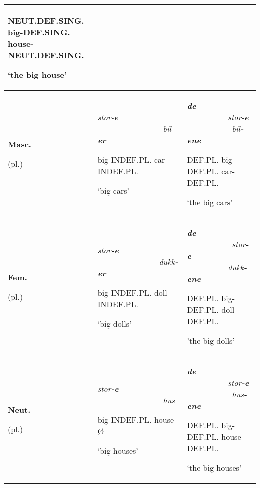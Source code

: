 \documentclass[12pt]{article}
\begin{document}
\begin{flushleft}
\begin{supertabular}{m{0.34905985in}m{2.7663598in}m{3.38376in}}
NEUT.DEF.SING. big-DEF.SING. house-NEUT.DEF.SING.

‘the big house’\\\hline
\textbf{Masc.}

(pl.) &
\textit{stor-}\textbf{\textit{e}}\textit{ \ \ \ \ \ \ \ \ \ \ \ \ \ \ \ \ bil-}\textbf{\textit{er}}

big-INDEF.PL. car-INDEF.PL.

‘big cars’ &
\textbf{\textit{de}}\textit{ \ \ \ \ \ \ \ \ \ \ stor-}\textbf{\textit{e}}\textit{ \ \ \ \ \ \ \ \ \ \ \ bil}\textbf{\textit{{}-ene}}

DEF.PL. big-DEF.PL. car-DEF.PL.

‘the big cars’\\\hline
\textbf{Fem.}

(pl.) &
\textit{stor}\textbf{\textit{{}-e}}\textit{ \ \ \ \ \ \ \ \ \ \ \ \ \ \ \ dukk}\textbf{\textit{{}-er}}

big-INDEF.PL. doll-INDEF.PL.

‘big dolls’ &
\textbf{\textit{de}}\textit{ \ \ \ \ \ \ \ \ \ \ \ stor}\textbf{\textit{{}-e}}\textit{ \ \ \ \ \ \ \ \ \ \ dukk}\textbf{\textit{{}-ene}}

DEF.PL. big-DEF.PL. doll-DEF.PL.

’the big dolls’\\\hline
\textbf{Neut.}

(pl.) &
\textit{stor}\textbf{\textit{{}-e}}\textit{ \ \ \ \ \ \ \ \ \ \ \ \ \ \ \ \ hus}

big-INDEF.PL. house-Ø

‘big houses’ &
\textbf{\textit{de}}\textit{ \ \ \ \ \ \ \ \ \ \ stor}\textbf{\textit{{}-e}}\textit{ \ \ \ \ \ \ \ \ \ \ \ hus}\textbf{\textit{{}-ene}}

DEF.PL. big-DEF.PL. house-DEF.PL.

‘the big houses’\\\hline
\end{supertabular}
\end{flushleft}
\end{document}
